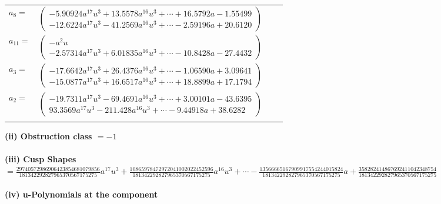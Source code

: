 \documentclass[1p]{elsarticle_modified}
\theoremstyle{definition}
\begin{document}
\begin{tabular}{m{7pt} m{180pt} m{7pt} m{180pt} }
\flushright $a_{8}=$&$\begin{pmatrix}-5.90924 a^{17} u^{3}+13.5578 a^{16} u^{3}+\cdots+16.5792 a-1.55499\\-12.6224 a^{17} u^{3}-41.2569 a^{16} u^{3}+\cdots-2.59196 a+20.6120\end{pmatrix}$ \\
\flushright $a_{11}=$&$\begin{pmatrix}- a^2 u\\-2.57314 a^{17} u^{3}+6.01835 a^{16} u^{3}+\cdots-10.8428 a-27.4432\end{pmatrix}$ \\
\flushright $a_{3}=$&$\begin{pmatrix}-17.6642 a^{17} u^{3}+26.4376 a^{16} u^{3}+\cdots-1.06590 a+3.09641\\-15.0877 a^{17} u^{3}+16.6517 a^{16} u^{3}+\cdots+18.8899 a+17.1794\end{pmatrix}$ \\
\flushright $a_{2}=$&$\begin{pmatrix}-19.7311 a^{17} u^{3}-69.4691 a^{16} u^{3}+\cdots+3.00101 a-43.6395\\93.3569 a^{17} u^{3}-211.428 a^{16} u^{3}+\cdots-9.44918 a+38.6282\end{pmatrix}$\\&\end{tabular}
\flushleft \textbf{(ii) Obstruction class $= -1$}\\~\\
\flushleft \textbf{(iii) Cusp Shapes $= \frac{29740572986906423854681079856}{181342292827965370567175275} a^{17} u^3+\frac{10865978472972041002022452596}{181342292827965370567175275} a^{16} u^3+\cdots-\frac{13566665167909917554244015824}{181342292827965370567175275} a+\frac{358282414867692411042348754}{181342292827965370567175275}$}\\~\\
\newpage\renewcommand{\arraystretch}{1}
\flushleft \textbf{(iv) u-Polynomials at the component}\newline \\
\end{document}
